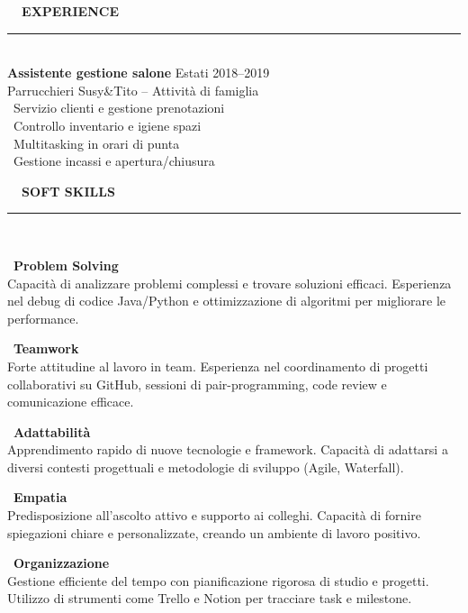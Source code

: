 \documentclass[10pt,a4paper]{article}
\newcommand{\mainsection}[2]{%
    \vspace{0.25cm}
    {\large\bfseries\textcolor{primary}{\faIcon{#1}~~#2}}\\[0.05cm]
    {\color{accent}\rule{11.5cm}{1.5pt}}\\[0.15cm]
}
\begin{document}
\begin{minipage}[t]{12.5cm}

\mainsection{briefcase}{EXPERIENCE}

\textbf{\textcolor{primary}{Assistente gestione salone}} \hfill \textcolor{accent}{\small Estati 2018--2019}\\
{\small Parrucchieri Susy\&Tito -- Attività di famiglia}\\[0.1cm]
{\small
\textcolor{success}{}~Servizio clienti e gestione prenotazioni\\
\textcolor{success}{}~Controllo inventario e igiene spazi\\
\textcolor{success}{}~Multitasking in orari di punta\\
\textcolor{success}{}~Gestione incassi e apertura/chiusura
}

\vspace{0.2cm}

\mainsection{brain}{SOFT SKILLS}

{\small
\textcolor{accent}{}~\textbf{Problem Solving}\\[0.05cm]
Capacità di analizzare problemi complessi e trovare soluzioni efficaci. Esperienza nel debug di codice Java/Python e ottimizzazione di algoritmi per migliorare le performance.

\vspace{0.15cm}
\textcolor{success}{}~\textbf{Teamwork}\\[0.05cm]
Forte attitudine al lavoro in team. Esperienza nel coordinamento di progetti collaborativi su GitHub, sessioni di pair-programming, code review e comunicazione efficace.

\vspace{0.15cm}
\textcolor{warning}{}~\textbf{Adattabilità}\\[0.05cm]
Apprendimento rapido di nuove tecnologie e framework. Capacità di adattarsi a diversi contesti progettuali e metodologie di sviluppo (Agile, Waterfall).

\vspace{0.15cm}
\textcolor{pink}{}~\textbf{Empatia}\\[0.05cm]
Predisposizione all'ascolto attivo e supporto ai colleghi. Capacità di fornire spiegazioni chiare e personalizzate, creando un ambiente di lavoro positivo.

\vspace{0.15cm}
\textcolor{purple}{}~\textbf{Organizzazione}\\[0.05cm]
Gestione efficiente del tempo con pianificazione rigorosa di studio e progetti. Utilizzo di strumenti come Trello e Notion per tracciare task e milestone.
}


\end{minipage}
\end{document}
